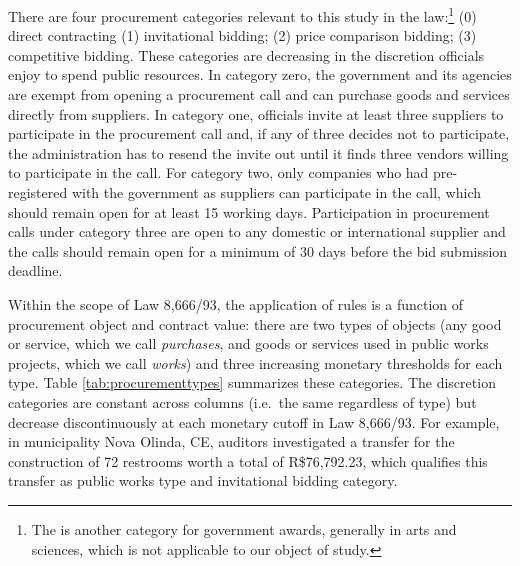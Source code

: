 \documentclass[11pt]{article}
\begin{document}
There are four procurement categories relevant to this study in the law:\footnote{The is another category for government awards, generally in arts and sciences, which is not applicable to our object of study.} (0) direct contracting (1) invitational bidding; (2) price comparison bidding; (3) competitive bidding. These categories are decreasing in the discretion officials enjoy to spend public resources. In category zero, the government and its agencies are exempt from opening a procurement call and can purchase goods and services directly from suppliers. In category one, officials invite at least three suppliers to participate in the procurement call and, if any of three decides not to participate, the administration has to resend the invite out until it finds three vendors willing to participate in the call. For category two, only companies who had pre-registered with the government as suppliers can participate in the call, which should remain open for at least 15 working days. Participation in procurement calls under category three are open to any domestic or international supplier and the calls should remain open for a minimum of 30 days before the bid submission deadline.

Within the scope of Law 8,666/93, the application of rules is a function of procurement object and contract value: there are two types of objects (any good or service, which we call \emph{purchases}, and goods or services used in public works projects, which we call \emph{works}) and three increasing monetary thresholds for each type. Table \ref{tab:procurementtypes} summarizes these categories. The discretion categories are constant across columns (i.e.~the same regardless of type) but decrease discontinuously at each monetary cutoff in Law 8,666/93. For example, in municipality Nova Olinda, CE, auditors investigated a transfer for the construction of 72 restrooms worth a total of R\$76,792.23, which qualifies this transfer as public works type and invitational bidding category.
\end{document}
